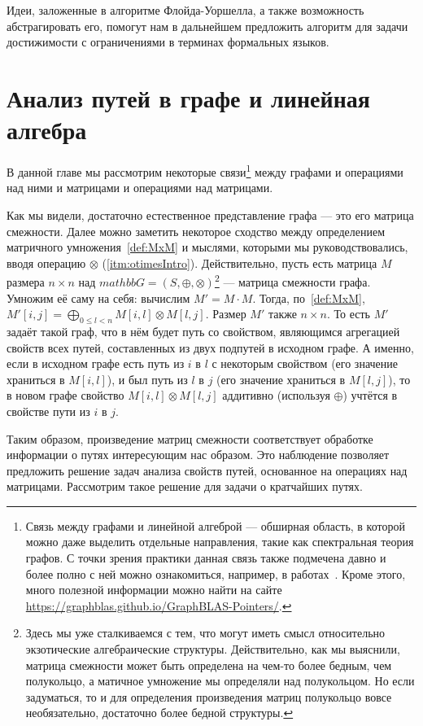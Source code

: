 Идеи, заложенные в алгоритме Флойда-Уоршелла, а также возможность абстрагировать его, помогут нам в дальнейшем предложить алгоритм для задачи достижимости с ограничениями в терминах формальных языков.

\section{Анализ путей в графе и линейная алгебра}

В данной главе мы рассмотрим некоторые связи\footnote{Связь между графами и линейной алгеброй --- обширная область, в которой можно даже выделить отдельные направления, такие как спектральная теория графов. С точки зрения практики данная связь также подмечена давно и более полно с ней можно ознакомиться, например, в работах~\cite{doi:10.1137/1.9780898719918, Davis2018Algorithm9S}. Кроме этого, много полезной информации можно найти на сайте \url{https://graphblas.github.io/GraphBLAS-Pointers/}.} между графами и операциями над ними и матрицами и операциями над матрицами. 

Как мы видели, достаточно естественное представление графа --- это его матрица смежности. Далее можно заметить некоторое сходство между определением матричного умножения~\ref{def:MxM} и мыслями, которыми мы руководствовались, вводя операцию $\otimes$ (\ref{itm:otimesIntro}). Действительно, пусть есть матрица $M$ размера $n \times n$ над $mathbb{G} = (S,\oplus,\otimes)$\footnote{Здесь мы уже сталкиваемся с тем, что могут иметь смысл относительно экзотические алгебраические структуры. Действительно, как мы выяснили, матрица смежности может быть определена на чем-то более бедным, чем полукольцо, а матичное умножение мы определяли над полукольцом. Но если задуматься, то и для определения произведения матриц полукольцо вовсе необязательно, достаточно более бедной структуры.} --- матрица смежности графа. Умножим её саму на себя: вычислим $M'= M \cdot M$. Тогда, по~\ref{def:MxM}, $M'[i,j] = \bigoplus_{0 \leq l < n} M[i,l] \otimes M[l,j]$. Размер $M'$ также $n \times n$. То есть $M'$ задаёт такой граф, что в нём будет путь со свойством, являющимся агрегацией свойств всех путей, составленных из двух подпутей в исходном графе. А именно, если в исходном графе есть путь из $i$ в $l$ с некоторым свойством (его значение храниться в $M[i,l]$), и был путь из $l$ в $j$ (его значение храниться в $M[l,j]$), то в новом графе свойство $M[i,l] \otimes M[l,j]$ аддитивно (используя $\oplus$) учтётся в свойстве пути из $i$ в $j$.     

Таким образом, произведение матриц смежности соответствует обработке информации о путях интересующим нас образом. Это наблюдение позволяет предложить решение задач анализа свойств путей, основанное на операциях над матрицами. Рассмотрим такое решение для задачи о кратчайших путях.

